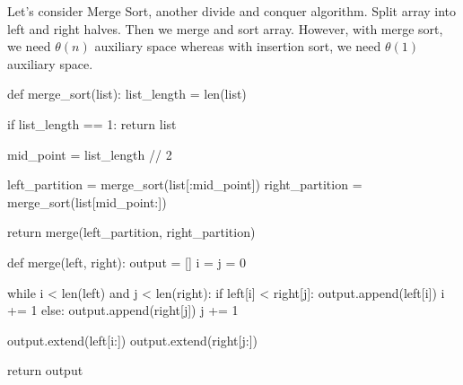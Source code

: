  Let's consider Merge Sort, another divide and conquer algorithm. Split array into left and right halves.
 Then we merge and sort array. However, with merge sort, we need \(\theta(n)\) auxiliary space whereas
 with insertion sort, we need \(\theta(1)\) auxiliary space.
 \begin{python}
 def merge_sort(list):
    list_length = len(list)

    if list_length == 1:
        return list

    mid_point = list_length // 2

    left_partition = merge_sort(list[:mid_point])
    right_partition = merge_sort(list[mid_point:])

    return merge(left_partition, right_partition)

def merge(left, right):
    output = []
    i = j = 0

    while i < len(left) and j < len(right):
        if left[i] < right[j]:
            output.append(left[i])
            i += 1
        else:
            output.append(right[j])
            j += 1

    output.extend(left[i:])
    output.extend(right[j:])

    return output
 \end{python}








